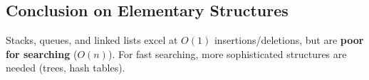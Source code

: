 \subsection{Conclusion on Elementary Structures}

\begin{tcolorbox}[colback=lightyellow, colframe=orange!70!black, fonttitle=\bfseries,
                  title={Strengths and Limitations}]
Stacks, queues, and linked lists excel at $O(1)$ insertions/deletions,
but are \textbf{poor for searching} ($O(n)$). For fast searching,
more sophisticated structures are needed (trees, hash tables).
\end{tcolorbox}